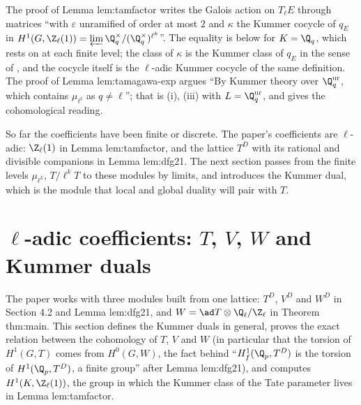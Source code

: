 \begin{paperlink}\label{pl:galcoh:kummer}
The proof of Lemma lem:tamfactor writes the Galois action on $T_\ell E$ through matrices ``with $\varepsilon$ unramified of order at most $2$ and $\kappa$ the Kummer
cocycle of $q_E$ in $H^1(G,\Z_\ell(1))=\varprojlim\Q_q^\times/(\Q_q^\times)^{\ell^k}$''. The equality is  below for $K=\Q_q$, which
rests on  at each finite level; the class of $\kappa$ is the Kummer class of $q_E$ in the sense of , and the
cocycle itself is the $\ell$-adic Kummer cocycle of the same definition. The proof of Lemma lem:tamagawa-exp argues ``By Kummer theory over
$\Q_q^{\mathrm{ur}}$, which contains $\mu_{\ell^t}$ as $q\ne\ell$''; that is (i), (iii) with $L=\Q_q^{\mathrm{ur}}$, and
 gives the cohomological reading.
\end{paperlink}

So far the coefficients have been finite or discrete. The paper's coefficients are $\ell$-adic: $\Z_\ell(1)$ in Lemma lem:tamfactor, and the lattice $T^D$ with its rational and
divisible companions in Lemma lem:dfg21. The next section passes from the finite levels $\mu_{\ell^k}$, $T/\ell^kT$ to these modules by limits, and introduces the Kummer
dual, which is the module that local and global duality will pair with $T$.
\section{\texorpdfstring{$\ell$}{l}-adic coefficients: \texorpdfstring{$T$}{T}, \texorpdfstring{$V$}{V}, \texorpdfstring{$W$}{W} and Kummer duals}\label{sec:galcoh:ladic}

The paper works with three modules built from one lattice: $T^D$, $V^D$ and $W^D$ in Section 4.2 and Lemma lem:dfg21, and $W=\ad T\otimes\Q_\ell/\Z_\ell$ in
Theorem thm:main. This section defines the Kummer duals in general, proves the exact relation between the cohomology of $T$, $V$ and $W$ (in particular that the
torsion of $H^1(G,T)$ comes from $H^0(G,W)$, the fact behind ``$H^1_f(\Q_p,T^D)$ is the torsion of $H^1(\Q_p,T^D)$, a finite group'' after Lemma lem:dfg21), and
computes $H^1(K,\Z_\ell(1))$, the group in which the Kummer class of the Tate parameter lives in Lemma lem:tamfactor.


